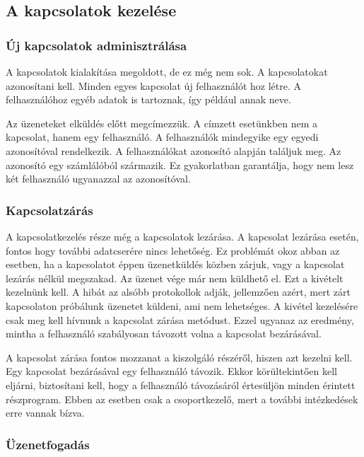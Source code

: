 \documentclass[bibliography=totocnumbered]{article}
\begin{document}
\subsection{A kapcsolatok kezelése}


\subsubsection{Új kapcsolatok
adminisztrálása}

A kapcsolatok kialakítása megoldott, de ez még nem sok. A kapcsolatokat
azonosítani kell. Minden egyes kapcsolat új felhasználót hoz létre. A
felhasználóhoz egyéb adatok is tartoznak, így például annak neve.

Az üzeneteket elküldés előtt megcímezzük. A címzett esetünkben nem a
kapcsolat, hanem egy felhasználó. A felhasználók mindegyike egy egyedi
azonosítóval rendelkezik. A felhasználókat azonosító alapján találjuk
meg. Az azonosító egy számlálóból származik. Ez gyakorlatban garantálja,
hogy nem lesz két felhasználó ugyanazzal az azonosítóval.


\subsubsection{Kapcsolatzárás}

A kapcsolatkezelés része még a kapcsolatok lezárása. A kapcsolat
lezárása esetén, fontos hogy további adatcserére nincs lehetőség. Ez
problémát okoz abban az esetben, ha a kapcsolatot éppen üzenetküldés
közben zárjuk, vagy a kapcsolat lezárás nélkül megszakad. Az üzenet vége
már nem küldhető el. Ezt a kivételt kezelnünk kell. A hibát az alsóbb
protokollok adják, jellemzően azért, mert zárt kapcsolaton próbálunk
üzenetet küldeni, ami nem lehetséges. A kivétel kezelésére csak meg kell
hívnunk a kapcsolat zárása metódust. Ezzel ugyanaz az eredmény, mintha a
felhasználó szabályosan távozott volna a kapcsolat bezárásával.

A kapcsolat zárása fontos mozzanat a kiszolgáló részéről, hiszen azt
kezelni kell. Egy kapcsolat bezárásával egy felhasználó távozik. Ekkor
körültekintően kell eljárni, biztosítani kell, hogy a felhasználó
távozásáról értesüljön minden érintett részprogram. Ebben az esetben
csak a csoportkezelő, mert a további intézkedések erre vannak bízva.


\subsubsection{Üzenetfogadás}
\end{document}

